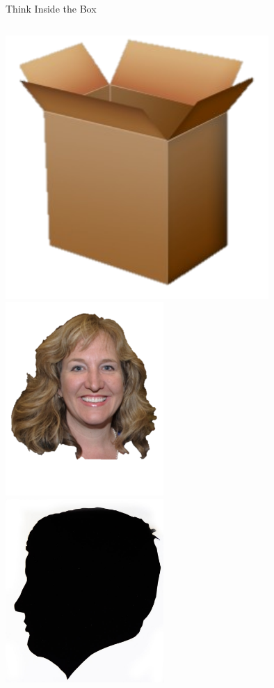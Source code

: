 \documentclass{beamer}
\begin{document}
\begin{frame}{Think Inside the Box}
    \begin{columns}[onlytextwidth] 
            \centering
            \includegraphics[width=0.75\textwidth]{img/box.png} \\

            \centering
            \includegraphics[width=0.45\textwidth]{img/amanda-marshall.png} \\
            \includegraphics[width=0.45\textwidth]{img/elmer-dickens.png} \\
    \end{columns}
\end{frame}
\end{document}
